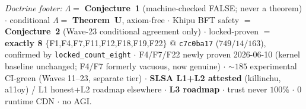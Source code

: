 \documentclass[11pt,letterpaper]{article}
\theoremstyle{definition}
\newcommand{\Lam}{\Lambda}
\begin{document}
\bigskip
\noindent\emph{Doctrine footer:} $\Lam =$ \textbf{Conjecture~1} (machine-checked
FALSE; never a theorem) $\cdot$ conditional $\Lam =$ \textbf{Theorem~U},
axiom-free $\cdot$ Khipu BFT safety $=$ \textbf{Conjecture~2} (Wave-23 conditional
agreement only) $\cdot$ locked-proven $=$ \textbf{exactly 8}
$\{$F1,F4,F7,F11,F12,F18,F19,F22$\}$ @ \texttt{c7c0ba17} ($749/14/163$), confirmed
by \texttt{locked\_count\_eight} $\cdot$ F4/F7/F22 newly proven 2026-06-10 (kernel
baseline unchanged; F4/F7 formerly vacuous, now genuine) $\cdot$ ${\sim}185$
experimental CI-green (Waves 11--23, separate tier) $\cdot$ \textbf{SLSA L1+L2
attested} (killinchu, a11oy) / L1 honest+L2 roadmap elsewhere $\cdot$ \textbf{L3
roadmap} $\cdot$ trust never $100\%$ $\cdot$ 0 runtime CDN $\cdot$ no AGI.
\end{document}
